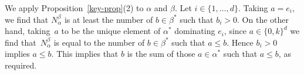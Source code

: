 \documentclass[ALCO]{cedram}
\begin{document}
We apply Proposition~\ref{key-prop}(2) to $\alpha$ and $\beta$.
Let $i \in \{1, \dots, d\}$.
Taking $a = e_i$, we find that $N^\beta_\alpha$ is at least the number of $b \in \beta^*$ such that $b_i > 0$.
On the other hand, taking~$a$ to be the unique element of $\alpha^*$ dominating $e_i$,
since $a \in \{0,k\}^d$ we find that~$N^\beta_\alpha$ is equal to the number of $b \in \beta^*$ such that $a \le b$.
Hence $b_i > 0$ implies $a \le b$.
This implies that $b$ is the sum of those $a \in \alpha^*$ such that $a \le b$, as required.



\end{document}

